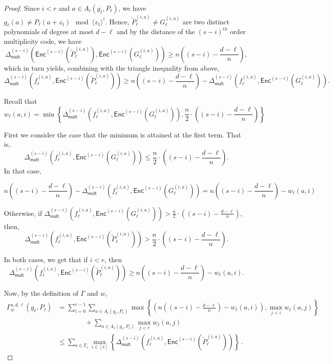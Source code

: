 \documentclass{theoretics}
\renewcommand{\tilde}[1]{\widetilde{#1}}
\newcommand{\enc}{{\mathsf{Enc}}}
\newcommand{\Delm}{\Delta_{\mathsf{mult}}}
\begin{document}
\begin{proof}
		Since $i <r$ and
		$a \in A_i(g_\ell, P_\ell)$, we have
		$g_\ell(a)\neq P_\ell(a+z_1) \mod \langle z_1\rangle^{i}$. Hence,
		$\tilde{P}_{\ell}^{(i,a)}\neq G_{\ell}^{(i,a)}$ are two distinct polynomials of degree at
		most $d-\ell$ and by the distance of the $(s-i)^{th}$ order
		multiplicity code, we have
		\[\Delm^{(s-i)} \left(\enc^{(s-i)}\left(\tilde{P}_{\ell}^{(i, a)}\right), \enc^{(s-i)}\left(G_{\ell}^{(i, a)}\right)\right)  \geq n\left((s-i) - \frac{d-\ell}n\right),  \]
		which in turn yields, combining with the triangle inequality from above,
		\[ \Delm^{(s-i)} \left(f_{\ell}^{(i, a)}, \enc^{(s-i)}\left(\tilde{P}_{\ell}^{(i, a)}\right)\right) \geq n\left((s-i) - \frac{d-\ell}n\right) - \Delm^{(s-i)} \left(f_{\ell}^{(i, a)}, \enc^{(s-i)}\left(G_{\ell}^{(i, a)}\right)\right).\]
		
		Recall that \[ w_\ell(a,i) = \min
		\left\{\Delm^{\left(s-i\right)}\left(f_\ell^{\left(i,
			a\right)} , \enc^{(s-i)}\left(G_\ell^{\left(i, a\right)}\right) \right), \frac{n}2\cdot\left((s-i)-\frac{d-\ell}n\right)\right\} \]
		
		First we consider the case that the minimum is attained at the first term. That is, \[\Delm^{(s-i)} \left(f_{\ell}^{(i, a)}, \enc^{(s-i)}\left(G_{\ell}^{(i, a)}\right)\right) \leq \frac{n}2\cdot\left((s-i)-\frac{d-\ell}n\right).\] In that case, 
		
		\[ n\left((s-i) - \frac{d-\ell}n\right) - \Delm^{(s-i)} \left(f_{\ell}^{(i, a)}, \enc^{(s-i)}\left(G_{\ell}^{(i, a)}\right)\right) = n\left((s-i) - \frac{d-\ell}n\right) - w_{\ell}(a,i) \]
		
		Otherwise, if $ \Delm^{(s-i)} \left(f_{\ell}^{(i, a)}, \enc^{(s-i)}\left(G_{\ell}^{(i, a)}\right)\right)>  \frac{n}2\cdot\left((s-i)-\frac{d-\ell}n\right)$, then, 
		\[ \Delm^{(s-i)} \left(f_{\ell}^{(i, a)}, \enc^{(s-i)}\left(\tilde{P}_{\ell}^{(i, a)}\right)\right)>  \frac{n}2\cdot\left((s-i)-\frac{d-\ell}n\right). \]
		
		In both cases, we get that if $i<r$, then
		\[ \Delm^{(s-i)} \left(f_{\ell}^{(i, a)}, \enc^{(s-i)}\left(\tilde{P}_{\ell}^{(i, a)}\right)\right) \geq n\left((s-i) - \frac{d-\ell}n\right) - w_{\ell}(a,i).\]
		
		Now, by the definition of $\Gamma$ and $w$, 
		\[ 
		\begin{split}
			\Gamma_w^{s, d, \ell}\left(g_\ell, P_\ell\right) & = \sum_{i = 0}^{r-1} \sum_{a \in A_i\left(g_\ell, P_\ell\right)} \max \left\{\left(n\left((s-i) - \frac{d-\ell}n\right) - w_{\ell}(a,i)\right), \max_{j < i} w_{\ell}(a, j) \right\}\\
            & \qquad \qquad + \sum_{a \in A_r\left(g_\ell, P_\ell\right)} \max_{j < r} w_{\ell}(a, j)\\
			& \leq \sum_{a \in T_1} \max_{i \in [s]} \left\{\Delm^{(s-i)} \left(f_{\ell}^{(i, a)}, \enc^{(s-i)}\left(\tilde{P}_{\ell}^{(i, a)}\right)\right)\right\}\,. 
		\end{split}
		\] 
		

\end{proof}
\end{document}
